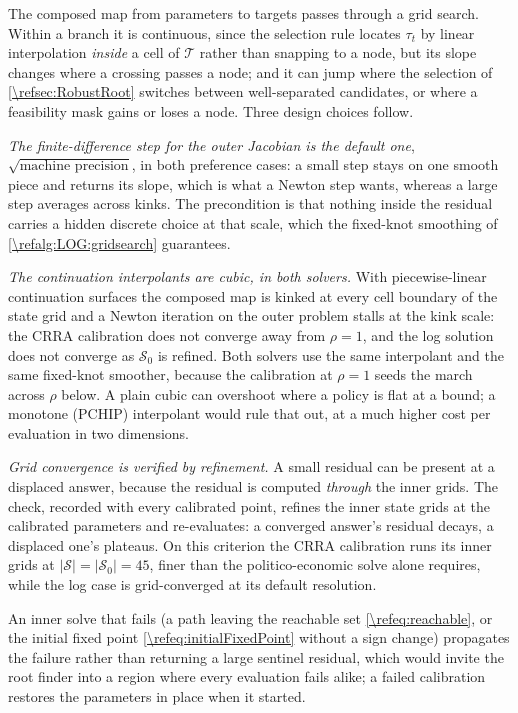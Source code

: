 The composed map from parameters to targets passes through a grid search. Within a branch it is continuous, since the selection rule locates $\tau_t$ by linear interpolation \emph{inside} a cell of $\mathcal{T}$ rather than snapping to a node, but its slope changes where a crossing passes a node; and it can jump where the selection of \cref{\refsec:RobustRoot} switches between well-separated candidates, or where a feasibility mask gains or loses a node. Three design choices follow.

\emph{The finite-difference step for the outer Jacobian is the default one}, $\sqrt{\text{machine precision}}$, in both preference cases: a small step stays on one smooth piece and returns its slope, which is what a Newton step wants, whereas a large step averages across kinks. The precondition is that nothing inside the residual carries a hidden discrete choice at that scale, which the fixed-knot smoothing of \cref{\refalg:LOG:gridsearch} guarantees.

\emph{The continuation interpolants are cubic, in both solvers.} With piecewise-linear continuation surfaces the composed map is kinked at every cell boundary of the state grid and a Newton iteration on the outer problem stalls at the kink scale: the CRRA calibration does not converge away from $\rho = 1$, and the log solution does not converge as $\mathcal{S}_0$ is refined. Both solvers use the same interpolant and the same fixed-knot smoother, because the calibration at $\rho = 1$ seeds the march across $\rho$ below. A plain cubic can overshoot where a policy is flat at a bound; a monotone (PCHIP) interpolant would rule that out, at a much higher cost per evaluation in two dimensions.

\emph{Grid convergence is verified by refinement.} A small residual can be present at a displaced answer, because the residual is computed \emph{through} the inner grids. The check, recorded with every calibrated point, refines the inner state grids at the calibrated parameters and re-evaluates: a converged answer's residual decays, a displaced one's plateaus. On this criterion the CRRA calibration runs its inner grids at $\vert\mathcal{S}\vert=\vert\mathcal{S}_0\vert=45$, finer than the politico-economic solve alone requires, while the log case is grid-converged at its default resolution.

An inner solve that fails (a path leaving the reachable set \eqref{\refeq:reachable}, or the initial fixed point \eqref{\refeq:initialFixedPoint} without a sign change) propagates the failure rather than returning a large sentinel residual, which would invite the root finder into a region where every evaluation fails alike; a failed calibration restores the parameters in place when it started.

